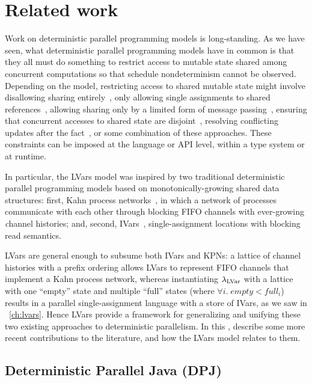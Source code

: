 \chapter{Related work}\label{ch:related} %

Work on deterministic parallel programming models is long-standing.
As we have seen, what deterministic parallel programming models have
in common is that they all must do something to restrict access to
mutable state shared among concurrent computations so that schedule
nondeterminism cannot be observed.  Depending on the model,
restricting access to shared mutable state might involve disallowing
sharing entirely~\cite{dph}, only allowing single assignments to
shared references~\cite{Tesler-1968, IStructures, CnC}, allowing
sharing only by a limited form of message passing~\cite{Kahn-1974},
ensuring that concurrent accesses to shared state are
disjoint~\cite{dpj-oopsla}, resolving conflicting updates after the
fact~\cite{concurrent-revisions-haskell11}, or some combination of
these approaches.  These constraints can be imposed at the language or
API level, within a type system or at runtime.

In particular, the LVars model was inspired by two traditional
deterministic parallel programming models based on
monotonically-growing shared data structures: first, Kahn process
networks~\cite{Kahn-1974}, in which a network of processes communicate
with each other through blocking FIFO channels with ever-growing
{\emph channel histories}; and, second, IVars~\cite{IStructures},
single-assignment locations with blocking read semantics.

LVars are general enough to subsume both IVars and KPNs: a lattice of
channel histories with a prefix ordering allows LVars to represent
FIFO channels that implement a Kahn process network, whereas
instantiating $\lambda_{\textrm{LVar}}$ with a lattice with one ``empty'' state
and multiple ``full'' states (where $\forall{i}.\; \mathit{empty} <
\mathit{full_i}$) results in a parallel single-assignment language
with a store of IVars, as we saw in ~\ref{ch:lvars}.  Hence
LVars provide a framework for generalizing and unifying these two
existing approaches to deterministic parallelism.  In this , 
describe some more recent contributions to the literature, and how the
LVars model relates to them.

\section{Deterministic Parallel Java (DPJ)}

